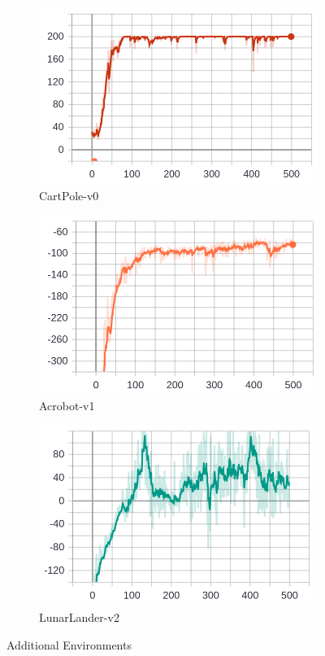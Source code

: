 \documentclass[12pt,a4paper]{article}
\begin{document}
\begin{figure}[H]
    \centering
    \begin{subfigure}[b]{0.3\textwidth}
        \includegraphics[width=\textwidth]{CartPole-v0.png}
        \caption{CartPole-v0}
        \label{fig:CartPole-v0}
    \end{subfigure}
    \begin{subfigure}[b]{0.3\textwidth}
        \includegraphics[width=\textwidth]{Acrobot-v1.png}
        \caption{Acrobot-v1}
        \label{fig:Acrobot-v1}
    \end{subfigure}
    \begin{subfigure}[b]{0.3\textwidth}
        \includegraphics[width=\textwidth]{LunarLander-v2}
        \caption{LunarLander-v2}
        \label{fig:LunarLander-v2}
    \end{subfigure}
    \caption{Additional Environments}


\end{figure}
\end{document}
